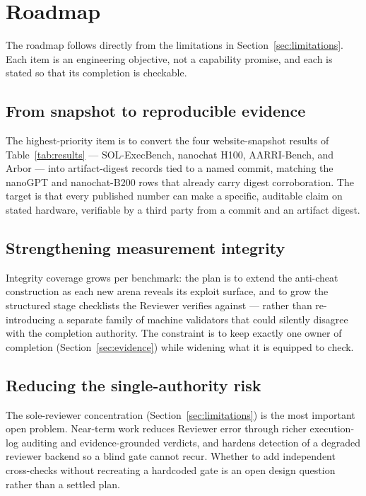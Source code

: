 \section{Roadmap}
\label{sec:roadmap}

The roadmap follows directly from the limitations in
Section~\ref{sec:limitations}. Each item is an engineering objective, not a
capability promise, and each is stated so that its completion is checkable.

\subsection{From snapshot to reproducible evidence}

The highest-priority item is to convert the four website-snapshot results of
Table~\ref{tab:results} --- SOL-ExecBench, nanochat H100, AARRI-Bench, and Arbor ---
into artifact-digest records tied to a named commit, matching the nanoGPT and
nanochat-B200 rows that already carry digest corroboration. The target is that every
published number can make a specific, auditable claim on stated hardware,
verifiable by a third party from a commit and an artifact digest.

\subsection{Strengthening measurement integrity}

Integrity coverage grows per benchmark: the plan is to extend the anti-cheat
construction as each new arena reveals its exploit surface, and to grow the
structured stage checklists the Reviewer verifies against --- rather than
re-introducing a separate family of machine validators that could silently disagree
with the completion authority. The constraint is to keep exactly one owner of
completion (Section~\ref{sec:evidence}) while widening what it is equipped to check.

\subsection{Reducing the single-authority risk}

The sole-reviewer concentration (Section~\ref{sec:limitations}) is the most
important open problem. Near-term work reduces Reviewer error through richer
execution-log auditing and evidence-grounded verdicts, and hardens detection of a
degraded reviewer backend so a blind gate cannot recur. Whether to add independent
cross-checks without recreating a hardcoded gate is an open design question rather
than a settled plan.

